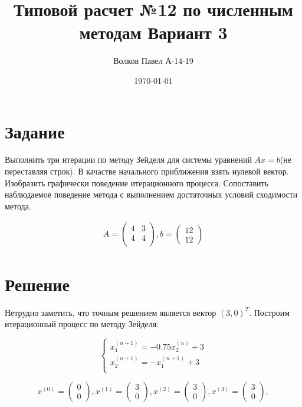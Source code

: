 \documentclass[a4paper,12pt]{report} %
\author{Волков Павел А-14-19}
\title{Типовой расчет №12 по численным методам Вариант 3}
\date{\today}
\begin{document}

\maketitle

\newpage
\section*{Задание}

Выполнить три итерации по методу Зейделя для системы уравнений $Ax = b$(не переставляя строк). В качастве начального приближения взять нулевой вектор. Изобразить графически поведение итерационного процесса. Сопоставить наблюдаемое поведение метода с выполнением достаточных условий сходимости метода.

\begin{gather*}
	A = 
	\begin{pmatrix}
		4 & 3 \\
		4 & 4 \\
	\end{pmatrix}, b = 
	\begin{pmatrix}
		12 \\ 12
	\end{pmatrix}
\end{gather*}

\section*{Решение}

Нетрудно заметить, что точным решением является вектор $(3, 0)^T$. Построим итерационный процесс по методу Зейделя:

\[
	\left\{
		\begin{aligned}
		x_1^{(n+1)} = -0.75x_2^{(n)} + 3  \\
		x_2^{(n+1)} = -x_1^{(n+1)} + 3 \\
		\end{aligned}
	\right.
\]

\[
	x^{(0)} = 
	\begin{pmatrix}
		0 \\ 0
	\end{pmatrix},
	x^{(1)} = 
	\begin{pmatrix}
		3 \\ 0
	\end{pmatrix},
	x^{(2)} = 
	\begin{pmatrix}
		3 \\ 0
	\end{pmatrix},
	x^{(3)} = 
	\begin{pmatrix}
		3 \\ 0
	\end{pmatrix},
\]
\end{document}
